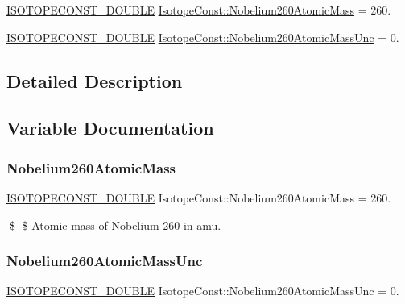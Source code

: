 \begin{DoxyCompactItemize}
\item 
\mbox{\hyperlink{group___isotope_const-_macros_ga8f45a7272ce02c0b4c65c44636ed719a}{I\+S\+O\+T\+O\+P\+E\+C\+O\+N\+S\+T\+\_\+\+D\+O\+U\+B\+LE}} \mbox{\hyperlink{group___isotope_const-_nobelium-_no260_gaad01485e77088b7cc15953120c1c72c8}{Isotope\+Const\+::\+Nobelium260\+Atomic\+Mass}} = 260.
\item 
\mbox{\hyperlink{group___isotope_const-_macros_ga8f45a7272ce02c0b4c65c44636ed719a}{I\+S\+O\+T\+O\+P\+E\+C\+O\+N\+S\+T\+\_\+\+D\+O\+U\+B\+LE}} \mbox{\hyperlink{group___isotope_const-_nobelium-_no260_ga2d7a0e27e6c0f58284c00d46c134d58b}{Isotope\+Const\+::\+Nobelium260\+Atomic\+Mass\+Unc}} = 0.
\end{DoxyCompactItemize}


\subsection{Detailed Description}


\subsection{Variable Documentation}
\mbox{\label{group___isotope_const-_nobelium-_no260_gaad01485e77088b7cc15953120c1c72c8}} 
\subsubsection{\texorpdfstring{Nobelium260\+Atomic\+Mass}{Nobelium260AtomicMass}}
{\footnotesize\ttfamily \mbox{\hyperlink{group___isotope_const-_macros_ga8f45a7272ce02c0b4c65c44636ed719a}{I\+S\+O\+T\+O\+P\+E\+C\+O\+N\+S\+T\+\_\+\+D\+O\+U\+B\+LE}} Isotope\+Const\+::\+Nobelium260\+Atomic\+Mass = 260.}

\$ \$ Atomic mass of Nobelium-\/260 in amu. \mbox{\label{group___isotope_const-_nobelium-_no260_ga2d7a0e27e6c0f58284c00d46c134d58b}} 
\subsubsection{\texorpdfstring{Nobelium260\+Atomic\+Mass\+Unc}{Nobelium260AtomicMassUnc}}
{\footnotesize\ttfamily \mbox{\hyperlink{group___isotope_const-_macros_ga8f45a7272ce02c0b4c65c44636ed719a}{I\+S\+O\+T\+O\+P\+E\+C\+O\+N\+S\+T\+\_\+\+D\+O\+U\+B\+LE}} Isotope\+Const\+::\+Nobelium260\+Atomic\+Mass\+Unc = 0.}


